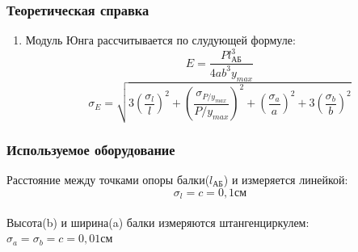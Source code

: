 \documentclass[a4paper,14pt]{extarticle}
\begin{document}
 	\subsubsection{Теоретическая справка}
	\begin{enumerate}
		\item Модуль Юнга рассчитывается по слудующей формуле:
		\[E = \dfrac{Pl_\text{АБ}^3}{4ab^3y_{max}}\]
		\[\sigma_E = \sqrt{3 \left( \dfrac{\sigma_{l}}{l} \right)^2 + \left( \dfrac{\sigma_{P/y_{max}}}{P/y_{max}} \right)^2 + \left( \dfrac{\sigma_{a}}{a} \right)^2 + 3 \left( \dfrac{\sigma_{b}}{b} \right)^2}\]
	\end{enumerate}
	\subsubsection{Используемое оборудование}
	Расстояние между точками опоры балки($l_\text{АБ}$) и измеряется линейкой: $$\sigma_l = c = 0,1\text{см}$$
\\	Высота(b) и ширина(a) балки измеряются штангенциркулем: $\sigma_a = \sigma_b = c = 0,01\text{см}$
\end{document}
